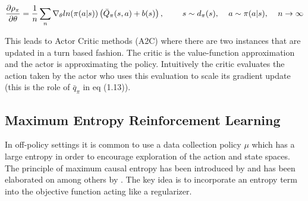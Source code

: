 \begin{align}
\frac{\partial\rho_\pi}{\partial\theta} = \frac{1}{n}\sum_{n} \nabla_\theta ln (\pi(a|s))\left( \bar{Q}_\pi(s,a)+b(s)\right),\text{\hspace{8mm}} s\sim d_\pi(s), \text{\hspace{4mm}} a\sim \pi(a|s), \text{\hspace{4mm}} n\rightarrow\infty
\end{align}

This leads to Actor Critic methods (A2C) where there are two instances that are updated in a turn based fashion. The critic is the value-function approximation and the actor is approximating the policy. Intuitively the critic evaluates the action taken by the actor who uses this evaluation to scale its gradient update (this is the role of $\bar{q}_\pi$ in eq (1.13)).

\subsection{Maximum Entropy Reinforcement Learning}
In off-policy settings it is common to use a data collection policy $\mu$ which has a large entropy in order to encourage exploration of the action and state spaces. The principle of maximum causal entropy has been introduced by \cite{AAAIziebert} and has been elaborated on among others by \cite{DBLP:journals/corr/HaarnojaTAL17}. The key idea is to incorporate an entropy term into the objective function acting like a regularizer. 

